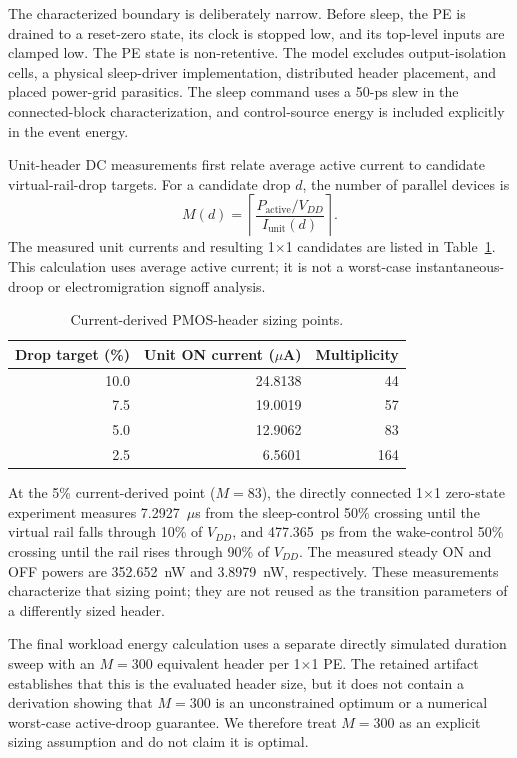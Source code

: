 The characterized boundary is deliberately narrow.  Before sleep, the PE is
drained to a reset-zero state, its clock is stopped low, and its top-level
inputs are clamped low.  The PE state is non-retentive.  The model excludes
output-isolation cells, a physical sleep-driver implementation, distributed
header placement, and placed power-grid parasitics.  The sleep command uses a
50-ps slew in the connected-block characterization, and control-source energy
is included explicitly in the event energy.

Unit-header DC measurements first relate average active current to candidate
virtual-rail-drop targets.  For a candidate drop $d$, the number of parallel
devices is
\begin{equation}
  M(d)=\left\lceil\frac{P_{\mathrm{active}}/V_{DD}}
  {I_{\mathrm{unit}}(d)}\right\rceil .
  \label{eq:header-sizing}
\end{equation}
The measured unit currents and resulting 1$\times$1 candidates are listed in
Table~\ref{tab:header-sizing-sweep}.  This calculation uses average active
current; it is not a worst-case instantaneous-droop or electromigration
signoff analysis.

\begin{table}[t]
  \centering
  \caption{Current-derived PMOS-header sizing points.}
  \label{tab:header-sizing-sweep}
  \begin{tabular}{rrr}
    \toprule
    Drop target (\%) & Unit ON current ($\mu$A) & Multiplicity \\
    \midrule
    10.0 & 24.8138 & 44 \\
     7.5 & 19.0019 & 57 \\
     5.0 & 12.9062 & 83 \\
     2.5 &  6.5601 & 164 \\
    \bottomrule
  \end{tabular}
\end{table}

At the 5\% current-derived point ($M=83$), the directly connected 1$\times$1
zero-state experiment measures 7.2927~$\mu$s from the sleep-control 50\%
crossing until the virtual rail falls through 10\% of $V_{DD}$, and
477.365~ps from the wake-control 50\% crossing until the rail rises through
90\% of $V_{DD}$.  The measured steady ON and OFF powers are 352.652~nW and
3.8979~nW, respectively.  These measurements characterize that sizing point;
they are not reused as the transition parameters of a differently sized
header.

The final workload energy calculation uses a separate directly simulated
duration sweep with an $M=300$ equivalent header per 1$\times$1 PE.  The
retained artifact establishes that this is the evaluated header size, but it
does not contain a derivation showing that $M=300$ is an unconstrained optimum
or a numerical worst-case active-droop guarantee.  We therefore treat
$M=300$ as an explicit sizing assumption and do not claim it is optimal.

